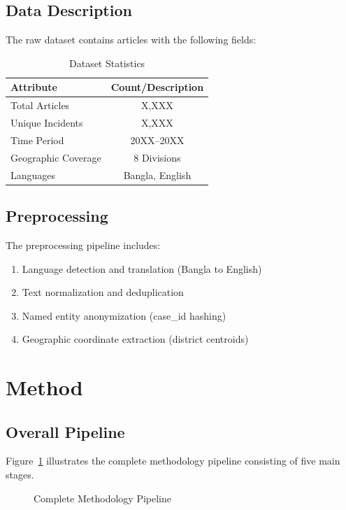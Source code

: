 \documentclass[12pt,a4paper]{article}
\begin{document}
\subsection{Data Description}
The raw dataset contains articles with the following fields:

\begin{table}[H]
\centering
\caption{Dataset Statistics}
\label{tab:dataset}
\begin{tabular}{@{}lc@{}}
\toprule
\textbf{Attribute} & \textbf{Count/Description} \\
\midrule
Total Articles & X,XXX \\
Unique Incidents & X,XXX \\
Time Period & 20XX--20XX \\
Geographic Coverage & 8 Divisions \\
Languages & Bangla, English \\
\bottomrule
\end{tabular}
\end{table}

\subsection{Preprocessing}
The preprocessing pipeline includes:
\begin{enumerate}
    \item Language detection and translation (Bangla to English)
    \item Text normalization and deduplication
    \item Named entity anonymization (case\_id hashing)
    \item Geographic coordinate extraction (district centroids)
\end{enumerate}

\section{Method}

\subsection{Overall Pipeline}
Figure~\ref{fig:pipeline} illustrates the complete methodology pipeline consisting of five main stages.

\begin{figure}[H]
\centering
{}
\caption{Complete Methodology Pipeline}
\label{fig:pipeline}
\end{figure}
\end{document}
